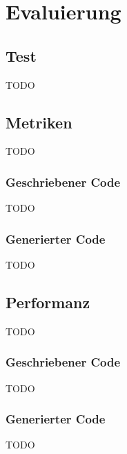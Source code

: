 \chapter{Evaluierung}

\section{Test}
TODO

\section{Metriken}
TODO

\subsection{Geschriebener Code}
TODO

\subsection{Generierter Code}
TODO

\section{Performanz}
TODO

\subsection{Geschriebener Code}
TODO

\subsection{Generierter Code}
TODO
